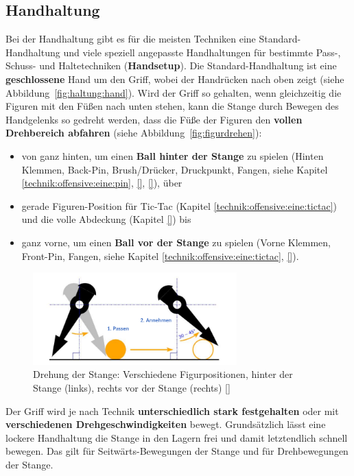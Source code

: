 \subsection{Handhaltung}
\label{technik:haltung:griffe}

Bei der Handhaltung gibt es für die meisten Techniken eine Standard-Handhaltung und viele speziell angepasste Handhaltungen für bestimmte Pass-, Schuss- und Haltetechniken (\textbf{Handsetup}). 
Die Standard-Handhaltung ist eine \textbf{geschlossene} Hand um den Griff, 
wobei der Handrücken nach oben zeigt (siehe Abbildung~\ref{fig:haltung:hand}).
Wird der Griff so gehalten, wenn gleichzeitig die Figuren mit den Füßen nach unten stehen, kann die Stange durch Bewegen des Handgelenks so gedreht werden, dass die Füße der Figuren den \textbf{vollen Drehbereich abfahren} (siehe Abbildung~\ref{fig:figurdrehen}):
\begin{itemize}
    \item von ganz hinten, um einen \textbf{Ball hinter der Stange} zu spielen (Hinten Klemmen, Back-Pin, Brush/Drücker, Druckpunkt, Fangen, siehe Kapitel \ref{technik:offensive:eine:pin}, \ref{}, \ref{}), über
\label{technik:offensive:eine:tictac}
    \item gerade Figuren-Position für Tic-Tac (Kapitel \ref{technik:offensive:eine:tictac}) und die volle Abdeckung (Kapitel \ref{}) bis 
    \item ganz vorne, um einen \textbf{Ball vor der Stange} zu spielen (Vorne Klemmen, Front-Pin, Fangen, siehe Kapitel \ref{technik:offensive:eine:tictac}, \ref{}).
\end{itemize}

\begin{figure}
    \centering 
        \includegraphics[width=0.7\textwidth]{img/haltung_figur.png} 
        \caption{Drehung der Stange: Verschiedene Figurpositionen, hinter der Stange (links), rechts vor der Stange (rechts) [\cite{itsf_basics}]} 
        \label{fig:haltung:figur} 
\end{figure}

Der Griff wird je nach Technik \textbf{unterschiedlich stark festgehalten} oder mit \textbf{verschiedenen Drehgeschwindigkeiten} bewegt.
Grundsätzlich lässt eine lockere Handhaltung die Stange in den Lagern frei und damit letztendlich schnell bewegen.
Das gilt für Seitwärts-Bewegungen der Stange und für Drehbewegungen der Stange.

